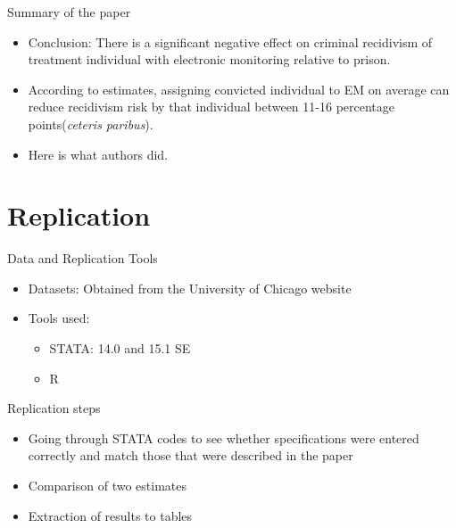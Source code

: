 \documentclass{beamer}
\begin{document}
\begin{frame}{Summary of the paper}
\begin{itemize}
        \item Conclusion: There is a significant negative effect on criminal recidivism of treatment individual with electronic monitoring relative to prison. 
        \item According to estimates, assigning convicted individual to EM on average can reduce recidivism risk by that individual between 11-16 percentage points(\textit{ceteris paribus}).
        \item  Here is what authors did.
    \end{itemize}
\end{frame}


\section{Replication}
\begin{frame}{Data and Replication Tools}
\begin{itemize}
    \item Datasets: Obtained from the University of Chicago website \item Tools used:
    \begin{itemize}
    \item STATA: 14.0 and  15.1 SE
    \item R
    \end{itemize}
    
\end{itemize}
\end{frame}
\begin{frame}{Replication steps}
 \begin{itemize}
    \item Going through STATA codes to see whether specifications were entered correctly and match those that were described in the paper
    \item Comparison of two estimates
    \item Extraction of results to tables
    \end{itemize}
\end{frame}

\end{document}
